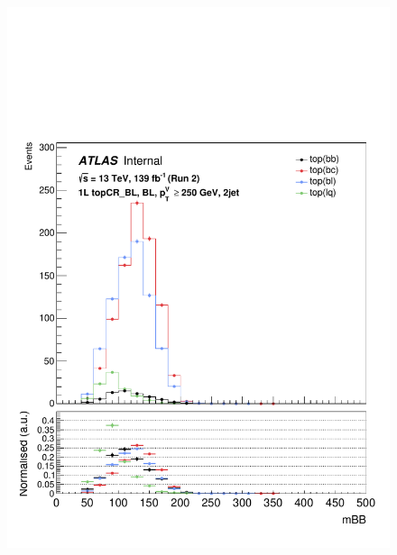 \begin{figure}[h!]
\center
\includegraphics[scale=0.253]{Images/VH/top/OneLepton_top_1bltag2jet_topCR_BL_250ptv_mBB.pdf}

\end{figure}
